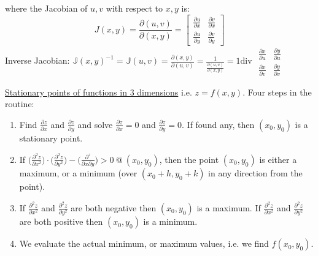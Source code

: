 \documentclass[12pt]{article}
\def\div{\text{div\ }} %
\begin{document}
\begin{flushleft}
	where the Jacobian of $u, v$ with respect to $x,y$ is: \linebreak 
	$$ \displaystyle J(x,y) = \frac{\partial(u,v)}{\partial(x,y)} = \left[ \begin{smallmatrix} \frac{\partial u}{\partial x} & \frac{\partial v}{\partial x} \\ \frac{\partial u}{\partial y} & \frac{\partial v}{\partial y} \end{smallmatrix} \right]$$ \linebreak 
	\textbullet \quad Inverse Jacobian: $\displaystyle \mathbb{J}(x,y)^{-1} = \mathbb{J}(u,v) = \frac{\partial (x,y)}{\partial (u,v)} = \frac{1}{\frac{\partial (u,v)}{\partial (x,y)}} = 1 \div \begin{smallmatrix} \frac{\partial x}{\partial u} & \frac{\partial y}{\partial u} \\ \frac{\partial x}{\partial v} & \frac{\partial y}{\partial v} \end{smallmatrix} $ \linebreak 
	
	\textbullet \quad \uline{Stationary points of functions in 3 dimensions} \linebreak 
	i.e. $z=f(x,y)$. Four steps in the routine:  
	\begin{enumerate}
	\item Find $\displaystyle \frac{\partial z}{\partial x}$ and $\displaystyle \frac{\partial z}{\partial y}$ and solve $\displaystyle \frac{\partial z}{\partial x} = 0$ and $\displaystyle \frac{\partial z}{\partial y} = 0$. If found any, then $(x_0,y_0)$ is a stationary point. 
	\item If $\displaystyle \big( \frac{\partial^2 z}{\partial x^2} \big) \cdot \big( \frac{\partial^2 z}{\partial y^2} \big) - \big( \frac{\partial^z}{\partial x \partial y} \big) > 0 \ @ \ (x_0, y_0)$, then the point $(x_0, y_0)$ is either a maximum, or a minimum (over $(x_0 + h, y_0 + k)$ in any direction from the point). 
	\item If $\frac{\partial^2 z}{\partial x^2}$ and $\frac{\partial^2 z}{\partial y^2}$ are both negative then $(x_0, y_0)$ is a maximum. If $\frac{\partial^2 z}{\partial x^2}$ and $\frac{\partial^2 z}{\partial y^2}$ are both positive then $(x_0,y_0)$ is a minimum. 
	\item We evaluate the actual minimum, or maximum values, i.e. we find $f(x_0, y_0)$. 
	\end{enumerate}
	

\end{flushleft}
\end{document}
